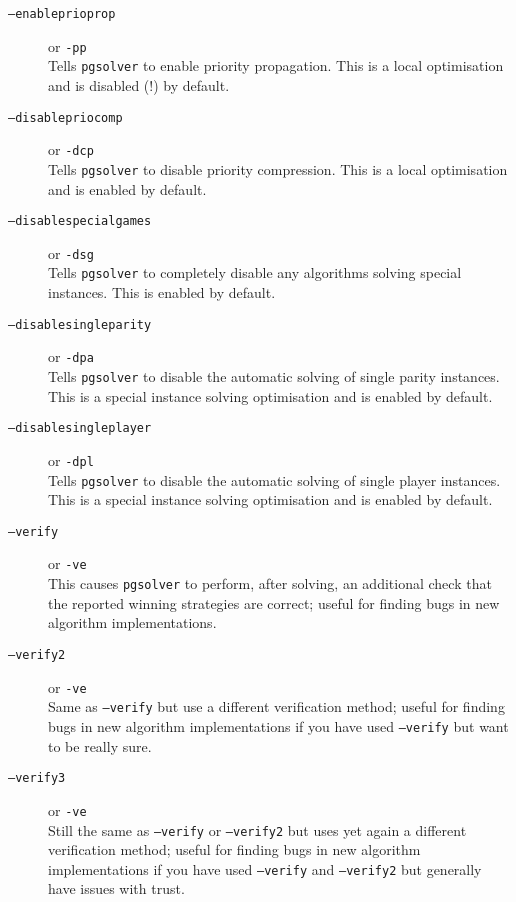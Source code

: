 \begin{description}
\item[{\tt --enableprioprop}]  \enspace or {\tt -pp} \\
   Tells \texttt{pgsolver} to enable priority propagation. This is a local optimisation and is disabled (!) by default.

\item[{\tt --disablepriocomp}]  \enspace or {\tt -dcp} \\
   Tells \texttt{pgsolver} to disable priority compression. This is a local optimisation and is enabled by default.

\item[{\tt --disablespecialgames}]  \enspace or {\tt -dsg} \\
   Tells \texttt{pgsolver} to completely disable any algorithms solving special instances. This is enabled by default.

\item[{\tt --disablesingleparity}]  \enspace or {\tt -dpa} \\
   Tells \texttt{pgsolver} to disable the automatic solving of single parity instances. This is a special instance solving optimisation and is enabled by default.

\item[{\tt --disablesingleplayer}]  \enspace or {\tt -dpl} \\
   Tells \texttt{pgsolver} to disable the automatic solving of single player instances. This is a special instance solving optimisation and is enabled by default.

\item[{\tt --verify}]  \enspace or {\tt -ve} \\
   This causes \texttt{pgsolver} to perform, after solving, an additional check that the reported winning
   strategies are correct; useful for finding bugs in new algorithm implementations.

\item[{\tt --verify2}]  \enspace or {\tt -ve} \\
   Same as {\tt --verify} but use a different verification method; useful for finding bugs in new
   algorithm implementations if you have used \texttt{--verify} but want to be really sure.

\item[{\tt --verify3}]  \enspace or {\tt -ve} \\
   Still the same as {\tt --verify} or {\tt --verify2} but uses yet again a different verification method;
   useful for finding bugs in new algorithm implementations if you have used \texttt{--verify} and
   \texttt{--verify2} but generally have issues with trust.


\end{description}
